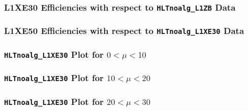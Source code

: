\documentclass[]{beamer}
\begin{document}
\begin{frame}
        \frametitle{L1XE30 Efficiencies with respect to \texttt{HLTnoalg\_L1ZB} Data}
\end{frame}
\begin{frame}
        \frametitle{L1XE50 Efficiencies with respect to \texttt{HLTnoalg\_L1XE30} Data}
\end{frame}
\begin{frame}
        \frametitle{\texttt{HLTnoalg\_L1XE30} Plot for $0<\mu<10$}
\end{frame}
\begin{frame}
        \frametitle{\texttt{HLTnoalg\_L1XE30} Plot for $10<\mu<20$}
\end{frame}
\begin{frame}
        \frametitle{\texttt{HLTnoalg\_L1XE30} Plot for $20<\mu<30$}
\end{frame}
\end{document}
